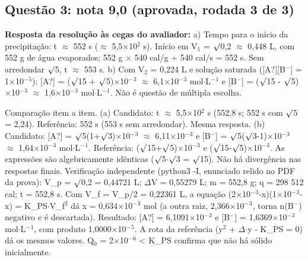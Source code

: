 \documentclass{article}%
\begin{document}
\subsection*{Questão 3: nota 9,0 (aprovada, rodada 3 de 3)}%
\textbf{Resposta da resolução às cegas do avaliador:} a) Tempo para o início da precipitação: t $\approx$ 552 s ($\approx$ 5,5$\times$10$^2$ s). Início em V$_{1}$ = $\surd$0,2 $\approx$ 0,448 L, com 552 g de água evaporados; 552 g $\times$ 540 cal/g ÷ 540 cal/s = 552 s. Sem arredondar $\surd$5, t $\approx$ 553 s.\newline%
\newline%
b) Com V$_{2}$ = 0,224 L e solução saturada ({[}A?{]}{[}B$^{-}${]} = 1$\times$10$^{-}$$^{5}$): {[}A?{]} = ($\surd$15 + $\surd$5)$\times$10$^{-}$$^3$ $\approx$ 6,1$\times$10$^{-}$$^3$ mol$\cdot$L$^{-}$$^{1}$ e {[}B$^{-}${]} = ($\surd$15 - $\surd$5)$\times$10$^{-}$$^3$ $\approx$ 1,6$\times$10$^{-}$$^3$ mol$\cdot$L$^{-}$$^{1}$.\newline%
\newline%
Não é questão de múltipla escolha.\par %
Comparação item a item. (a) Candidato: t $\approx$ 5,5$\times$10$^2$ s (552,8 s; 552 s com $\surd$5 = 2,24). Referência: 552 s (553 s sem arredondar). Mesma resposta. (b) Candidato: {[}A?{]} = $\surd$5(1+$\surd$3)$\times$10$^{-}$$^3$ $\approx$ 6,11$\times$10$^{-}$$^3$ e {[}B$^{-}${]} = $\surd$5($\surd$3-1)$\times$10$^{-}$$^3$ $\approx$ 1,64$\times$10$^{-}$$^3$ mol$\cdot$L$^{-}$$^{1}$. Referência: ($\surd$15+$\surd$5)$\times$10$^{-}$$^3$ e ($\surd$15-$\surd$5)$\times$10$^{-}$$^3$. As expressões são algebricamente idênticas ($\surd$5$\cdot$$\surd$3 = $\surd$15). Não há divergência nas respostas finais.\newline%
\newline%
Verificação independente (python3 {-}I, enunciado relido no PDF da prova): V\_p = $\surd$0,2 = 0,44721 L; $\Delta$V = 0,55279 L; m = 552,8 g; q = 298 512 cal; t = 552,8 s. Com V\_f = V\_p/2 = 0,22361 L, a equação (2$\times$10$^{-}$$^3$-x)(1$\times$10$^{-}$$^3$-x) = K\_PS$\cdot$V\_f$^2$ dá x = 0,634$\times$10$^{-}$$^3$ mol (a outra raiz, 2,366$\times$10$^{-}$$^3$, torna n(B$^{-}$) negativo e é descartada). Resultado: {[}A?{]} = 6,1091$\times$10$^{-}$$^3$ e {[}B$^{-}${]} = 1,6369$\times$10$^{-}$$^3$ mol$\cdot$L$^{-}$$^{1}$, com produto 1,0000$\times$10$^{-}$$^{5}$. A rota da referência (y$^2$ + $\Delta$$\cdot$y - K\_PS = 0) dá os mesmos valores. Q$_{0}$ = 2$\times$10$^{-}$$^{6}$ < K\_PS confirma que não há sólido inicialmente.\newline%
$$
\end{document}
